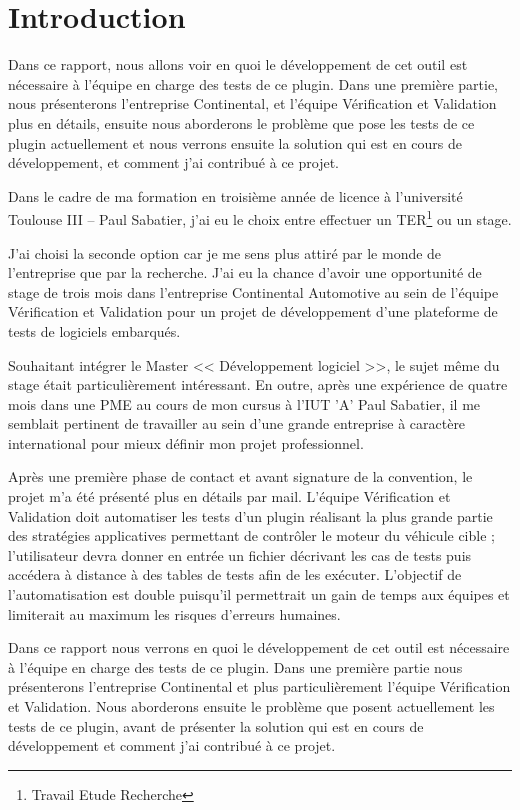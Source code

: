 \chapter*{Introduction}
	Dans ce rapport, nous allons voir en quoi le développement de cet outil est nécessaire à l'équipe en charge des tests de ce plugin. Dans une première partie, nous présenterons l'entreprise Continental, et l'équipe Vérification et Validation plus en détails, ensuite nous aborderons le problème que pose les tests de ce plugin actuellement et nous verrons ensuite la solution qui est en cours de développement, et comment j'ai contribué à ce projet.

Dans le cadre de ma formation en troisième année de licence à l'université Toulouse III – Paul Sabatier, j'ai eu le choix entre effectuer un TER\footnote{Travail Etude Recherche} ou un stage. 

J'ai choisi la seconde option car je me sens plus attiré par le monde de l'entreprise que par la recherche. J'ai eu la chance d'avoir une opportunité de stage de trois mois dans l'entreprise Continental Automotive au sein de l'équipe Vérification et Validation pour un projet de développement d'une plateforme de tests de logiciels embarqués.

Souhaitant intégrer le Master << Développement logiciel >>, le sujet même du stage était particulièrement intéressant. En outre, après une expérience de quatre mois dans une PME au cours de mon cursus à l'IUT 'A' Paul Sabatier, il me semblait pertinent de travailler au sein d'une grande entreprise à caractère international pour mieux définir mon projet professionnel.

Après une première phase de contact et avant signature de la convention, le projet m'a été présenté plus en détails par mail. L'équipe Vérification et Validation doit automatiser les tests d'un plugin réalisant la plus grande partie des stratégies applicatives permettant de contrôler le moteur du véhicule cible ; l'utilisateur devra donner en entrée un fichier décrivant les cas de tests puis accédera à distance à des tables de tests afin de les exécuter. L'objectif de l'automatisation est double puisqu'il permettrait un gain de temps aux équipes et limiterait au maximum les risques d'erreurs humaines.

Dans ce rapport nous verrons en quoi le développement de cet outil est nécessaire à l'équipe en charge des tests de ce plugin. Dans une première partie nous présenterons l'entreprise Continental et plus particulièrement l'équipe Vérification et Validation. Nous aborderons ensuite le problème que posent actuellement les tests de ce plugin, avant de présenter la solution qui est en cours de développement et comment j'ai contribué à ce projet.
